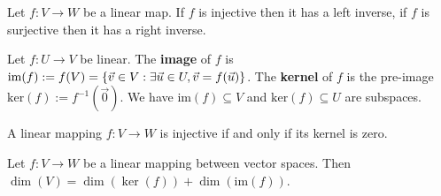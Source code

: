 \begin{multicols}{2}
\begin{theorem}[1.7.9]
Let $f:V\to W$ be a linear map. If $f$ is injective then it has a left inverse, if $f$ is surjective then it has a right inverse.
\end{theorem}

\begin{definition}
Let $f:U\to V$ be linear. The \textbf{image} of $f$ is $\mathrm{im}(f) := f(V) =\{\vec{v}\in V:\exists\vec{u}\in U,\vec{v} = f(\vec{u})\}$. The \textbf{kernel} of $f$ is the pre-image $\mathrm{ker}(f):=f^{-1}(\vec{0})$. We have $\mathrm{im}(f)\subseteq V$ and $\mathrm{ker}(f)\subseteq U$ are subspaces.
\end{definition}

\begin{theorem}[1.8.2]
A linear mapping $f : V \to W$ is injective if and only if its kernel is zero.
\end{theorem}

\begin{theorem}
Let $f : V \to W$ be a linear mapping between vector spaces. Then $\dim(V) = \dim(\ker(f)) + \dim(\mathrm{im}(f))$.
\end{theorem}

\end{multicols}

